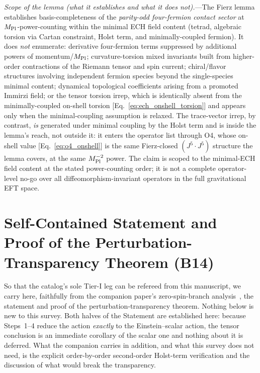 \documentclass[aps,prd,twocolumn,superscriptaddress,showpacs,preprintnumbers,nofootinbib,longbibliography,floatfix]{revtex4-2}
\begin{document}
\textit{Scope of the lemma (what it establishes and what it does not).}---The
Fierz lemma establishes basis-completeness of the \emph{parity-odd four-fermion
contact sector} at $M_{\rm Pl}$-power-counting within the minimal ECH field
content (tetrad, algebraic torsion via Cartan constraint, Holst term, and
minimally-coupled fermion). It does \emph{not} enumerate: derivative four-fermion
terms suppressed by additional powers of momentum/$M_{\rm Pl}$; curvature-torsion
mixed invariants built from higher-order contractions of the Riemann tensor and
spin current; chiral/flavor structures involving independent fermion species
beyond the single-species minimal content; dynamical topological coefficients
arising from a promoted Immirzi field; or the tensor torsion irrep, which is
identically absent from the minimally-coupled on-shell torsion
[Eq.~\eqref{eq:ech_onshell_torsion}] and appears only when the
minimal-coupling assumption is relaxed. The trace-vector irrep, by contrast,
\emph{is} generated under minimal coupling by the Holst term and is inside
the lemma's reach, not outside it: it enters the operator list through O4,
whose on-shell value [Eq.~\eqref{eq:o4_onshell}] is the same Fierz-closed
$(J^5\!\cdot\!J^5)$ structure the lemma covers, at the same
$M_{\rm Pl}^{-2}$ power. The claim is scoped to the minimal-ECH field content at
the stated power-counting order; it is not a complete operator-level no-go over
all diffeomorphism-invariant operators in the full gravitational EFT space.

\section{Self-Contained Statement and Proof of the
Perturbation-Transparency Theorem (B14)}\label{app:transparency}

So that the catalog's sole Tier-I leg can be refereed from this
manuscript, we carry here, faithfully from the companion paper's
zero-spin-branch analysis~\cite{Golden2026P1a}, the statement and proof
of the perturbation-transparency theorem. Nothing below is new to this
survey. Both halves of the Statement are established here: because
Steps~1--4 reduce the action \emph{exactly} to the Einstein--scalar
action, the tensor conclusion is an immediate corollary of the scalar
one and nothing about it is deferred. What the companion carries in
addition, and what this survey does not need, is the explicit
order-by-order second-order Holst-term verification and the discussion of
what would break the transparency.
\end{document}
